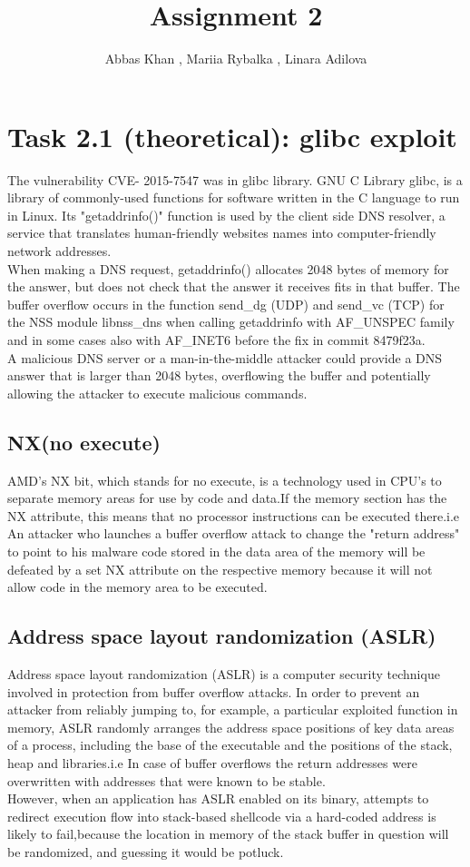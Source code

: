 \documentclass{article}
\title{Assignment 2}
\author{Abbas Khan , Mariia Rybalka , Linara Adilova}
\begin{document}
\maketitle 
    
\section*{Task 2.1 (theoretical): glibc exploit}
    The vulnerability CVE- 2015-7547 was in glibc library. GNU C Library glibc, is a library of commonly-used functions for software written in the C language to run in Linux. Its "getaddrinfo()" function is used by the client side DNS resolver, a service that translates human-friendly websites names into computer-friendly network addresses.
\\
When making a DNS request, getaddrinfo() allocates 2048 bytes of memory for the answer, but does not check that the answer it receives fits in that buffer. The buffer overflow occurs in the function send{\_}dg (UDP) and send{\_}vc (TCP) for the NSS module libnss{\_}dns when calling getaddrinfo with AF{\_}UNSPEC family and in some cases also with AF{\_}INET6 before the fix in
commit 8479f23a.
\\
A malicious DNS server or a man-in-the-middle attacker could provide a DNS answer that is larger than 2048 bytes, overflowing the buffer and potentially allowing the attacker to execute malicious commands.
	  
\subsection*{NX(no execute)}
AMD's NX bit, which stands for no execute, is a technology used in CPU's to separate memory areas
for use by code and data.If the memory section has the NX attribute, this means that no processor instructions can be executed there.i.e An attacker who launches a buffer overflow attack to change
the "return address" to point to his malware code stored in the data area of the memory will be 
defeated by a set NX attribute on the respective memory because it will not allow code in the
memory area to be executed. 
	 
\subsection*{Address space layout randomization (ASLR)}
Address space layout randomization (ASLR) is a computer security technique involved in protection from buffer overflow attacks. In order to prevent an attacker from reliably jumping to, for example, a particular exploited function in memory, ASLR randomly arranges the address space positions of key data areas of a process, including the base of the executable and the positions of the stack, heap and libraries.i.e In case of buffer overflows the return addresses were overwritten with addresses that were known to be stable.
\\
However, when an application has ASLR enabled on its binary, attempts to redirect execution flow
into stack-based shellcode via a hard-coded address is likely to fail,because the location in 
memory of the stack buffer in question will be randomized, and guessing it would be potluck.
\end{document}
